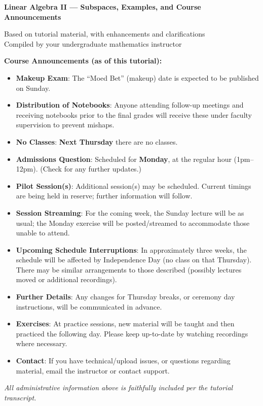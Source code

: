 \documentclass[11pt,a4paper]{article}
\theoremstyle{definition}
\theoremstyle{plain}
\theoremstyle{remark}
\begin{document}
\begin{center}
    {\LARGE \bf Linear Algebra II --- Subspaces, Examples, and Course Announcements}
    \vspace{0.5em}

    {\large Based on tutorial material, with enhancements and clarifications\\
    Compiled by your undergraduate mathematics instructor}
\end{center}

\begin{administrative_note}
\textbf{Course Announcements (as of this tutorial):}
\begin{itemize}[itemsep=0.25em]
    \item \textbf{Makeup Exam}: The ``Moed Bet'' (makeup) date is expected to be published on Sunday.
    \item \textbf{Distribution of Notebooks}: Anyone attending follow-up meetings and receiving notebooks prior to the final grades will receive these under faculty supervision to prevent mishaps.
    \item \textbf{No Classes}: \textbf{Next Thursday} there are no classes.
    \item \textbf{Admissions Question}: Scheduled for \textbf{Monday}, at the regular hour (1pm--12pm). (Check for any further updates.)
    \item \textbf{Pilot Session(s)}: Additional session(s) may be scheduled. Current timings are being held in reserve; further information will follow.
    \item \textbf{Session Streaming}: For the coming week, the Sunday lecture will be as usual; the Monday exercise will be posted/streamed to accommodate those unable to attend.
    \item \textbf{Upcoming Schedule Interruptions}: In approximately three weeks, the schedule will be affected by Independence Day (no class on that Thursday). There may be similar arrangements to those described (possibly lectures moved or additional recordings).
    \item \textbf{Further Details}: Any changes for Thursday breaks, or ceremony day instructions, will be communicated in advance.
    \item \textbf{Exercises}: At practice sessions, new material will be taught and then practiced the following day. Please keep up-to-date by watching recordings where necessary.
    \item \textbf{Contact}: If you have technical/upload issues, or questions regarding material, email the instructor or contact support.
\end{itemize}
\textit{All administrative information above is faithfully included per the tutorial transcript.}
\end{administrative_note}
\end{document}
